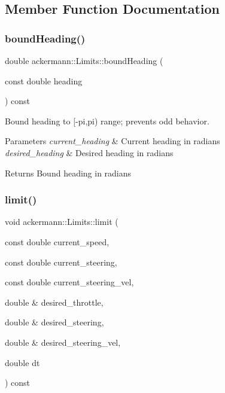 \subsection{Member Function Documentation}
\mbox{\label{classackermann_1_1_limits_a18e0ace6fde91bf5b641197dafbd5f57}} 
\subsubsection{\texorpdfstring{bound\+Heading()}{boundHeading()}}
{\footnotesize\ttfamily double ackermann\+::\+Limits\+::bound\+Heading (\begin{DoxyParamCaption}\item[{const double}]{heading }\end{DoxyParamCaption}) const}



Bound heading to \mbox{[}-\/pi,pi) range; prevents odd behavior. 


\begin{DoxyParams}{Parameters}
{\em current\+\_\+heading} & Current heading in radians \\
\hline
{\em desired\+\_\+heading} & Desired heading in radians \\
\hline
\end{DoxyParams}
\begin{DoxyReturn}{Returns}
Bound heading in radians 
\end{DoxyReturn}
\mbox{\label{classackermann_1_1_limits_a1fcf66ef8f8161d38e3d77c1e5acfb92}} 
\subsubsection{\texorpdfstring{limit()}{limit()}}
{\footnotesize\ttfamily void ackermann\+::\+Limits\+::limit (\begin{DoxyParamCaption}\item[{const double}]{current\+\_\+speed,  }\item[{const double}]{current\+\_\+steering,  }\item[{const double}]{current\+\_\+steering\+\_\+vel,  }\item[{double \&}]{desired\+\_\+throttle,  }\item[{double \&}]{desired\+\_\+steering,  }\item[{double \&}]{desired\+\_\+steering\+\_\+vel,  }\item[{double}]{dt }\end{DoxyParamCaption}) const}



